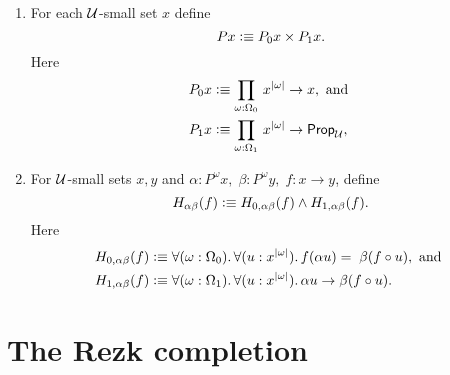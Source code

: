\documentclass[hott-all.tex]{subfiles}
\begin{document}
\begin{defn}
\mbox{}
\begin{enumerate}
\item For each $\mathcal{U}$-small set $x$ define
  \[ Px \vcentcolon\equiv P_0x\times P_1x.\]
  Here
  \begin{align*}
    P_0x &\defeq \prd{\omega:\Omega_0} x^{|\omega|}\to x, \mbox{ and } \\
    P_1x &\defeq \prd{\omega:\Omega_1} x^{|\omega|}\to \propU,
  \end{align*}
\item For $\mathcal{U}$-small sets $x,y$ and
  $\alpha:P^\omega x,\;\beta:P^\omega y,\; f:x\to y$, define
  \[ H_{\alpha\beta}(f) \vcentcolon\equiv H_{0,\alpha\beta}(f)\wedge H_{1,\alpha\beta}(f).\]
  Here
  \begin{align*}
    H_{0,\alpha\beta}(f) &\defeq
    \fall{\omega:\Omega_0}{u:x^{|\omega|}} f(\alpha u)=\;\beta(f\circ u),
    \mbox{ and }\\
    H_{1,\alpha\beta}(f) &\defeq
    \fall{\omega:\Omega_1}{u:x^{|\omega|}} \alpha u\to\beta(f\circ u).
  \end{align*}
\end{enumerate}
\end{defn}



\section{The Rezk completion}

%
\end{document}
